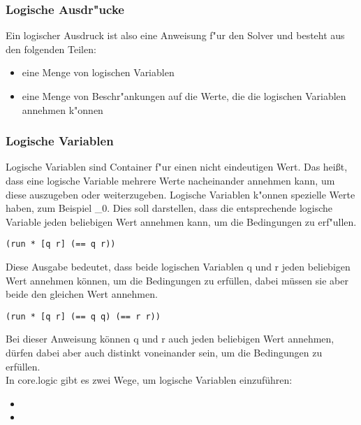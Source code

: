 
\subsubsection{Logische Ausdr"ucke}

Ein logischer Ausdruck ist also eine Anweisung f"ur den Solver und besteht aus den folgenden Teilen:
\begin{itemize}

\item eine Menge von logischen Variablen

\item eine Menge von Beschr"ankungen auf die Werte, die die logischen Variablen annehmen k"onnen

\end{itemize}


\subsubsection{Logische Variablen}
Logische Variablen sind Container f"ur einen nicht eindeutigen Wert. Das hei\ss{}t, dass eine logische Variable mehrere Werte nacheinander annehmen kann, um diese auszugeben oder weiterzugeben.
Logische Variablen k"onnen spezielle Werte haben, zum Beispiel \_0. Dies soll darstellen, dass die entsprechende logische Variable jeden beliebigen Wert annehmen kann, um die Bedingungen zu erf"ullen.

\begin{lstlisting}
(run * [q r] (== q r))
\end{lstlisting}
\begin{flushleft}
\end{flushleft}
Diese Ausgabe bedeutet, dass beide logischen Variablen q und r jeden beliebigen Wert annehmen können, um die Bedingungen zu erfüllen, dabei müssen sie aber beide den gleichen Wert annehmen.

\begin{lstlisting}
(run * [q r] (== q q) (== r r))
\end{lstlisting}
\begin{flushleft}
\end{flushleft}
Bei dieser Anweisung können q und r auch jeden beliebigen Wert annehmen, dürfen dabei aber auch distinkt voneinander sein, um die Bedingungen zu erfüllen.\\


In core.logic gibt es zwei Wege, um logische Variablen einzuführen:
\begin{itemize}
\item {}
\item {}
\end{itemize}

